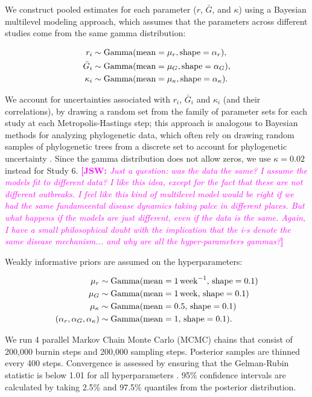 \documentclass[12pt]{article}
\newcommand{\comment}[3]{\textcolor{#1}{\textbf{[#2: }\textsl{#3}\textbf{]}}}
\newcommand{\jsw}[1]{\comment{magenta}{JSW}{#1}}
\begin{document}
We construct pooled estimates for each parameter ($r$, $\bar G$, and $\kappa$) using a Bayesian multilevel modeling approach, which assumes that the parameters across different studies come from the same gamma distribution:
\begin{linenomath*}
\begin{equation}
\begin{aligned}
r_i &\sim \mathrm{Gamma}(\mathrm{mean}=\mu_r, \mathrm{shape}=\alpha_r),\\
\bar{G}_i &\sim \mathrm{Gamma}(\mathrm{mean}=\mu_G, \mathrm{shape}=\alpha_G),\\
\kappa_i &\sim \mathrm{Gamma}(\mathrm{mean}=\mu_\kappa, \mathrm{shape}=\alpha_\kappa).\\
\end{aligned}
\end{equation}
\end{linenomath*}
We account for uncertainties associated with $r_i$, $\bar G_i$ and $\kappa_i$ (and their correlations), by drawing a random set from the family of parameter sets for each study at each Metropolis-Hastings step;
this approach is analogous to Bayesian methods for analyzing phylogenetic data, which often rely on drawing random samples of phylogenetic trees from a discrete set to account for phylogenetic uncertainty \citep{pagel2004bayesian,bedford2014integrating}.
Since the gamma distribution does not allow zeros, we use $\kappa =0.02$ instead for Study 6.
\jsw{Just a question: was the data the same?  I assume the models fit to different data?  I like this idea, except for the fact that these are not different outbreaks. I feel like this kind of multilevel model would be right if we had the same fundameental disease dynamics taking palce in different places. But what happens if the models are just different, even if the data is the same.  Again, I have a small philosophical doubt with the implication that the i-s denote the same disease mechanism... and why are all the hyper-parameters gammas?}

Weakly informative priors are assumed on the hyperparameters:
\begin{linenomath*}
\begin{equation}
\begin{aligned}
\mu_r &\sim \mathrm{Gamma}(\mathrm{mean}=1\,\mathrm{week}^{-1},\,\mathrm{shape}=0.1)\\
\mu_G &\sim \mathrm{Gamma}(\mathrm{mean}=1\,\mathrm{week},\,\mathrm{shape}=0.1)\\
\mu_\kappa &\sim \mathrm{Gamma}(\mathrm{mean}=0.5,\,\mathrm{shape}=0.1)\\
(\alpha_r, \alpha_G, \alpha_\kappa) &\sim \mathrm{Gamma}(\mathrm{mean}=1,\,\mathrm{shape}=0.1).
\end{aligned}
\end{equation}
\end{linenomath*}
We run 4 parallel Markov Chain Monte Carlo (MCMC) chains that consist of 200,000 burnin steps and 200,000 sampling steps.
Posterior samples are thinned every 400 steps.
Convergence is assessed by ensuring that the Gelman-Rubin statistic is below 1.01 for all hyperparameters \citep{gelman1992inference}.
95\% confidence intervals are calculated by taking 2.5\% and 97.5\% quantiles from the posterior distribution.
\end{document}
